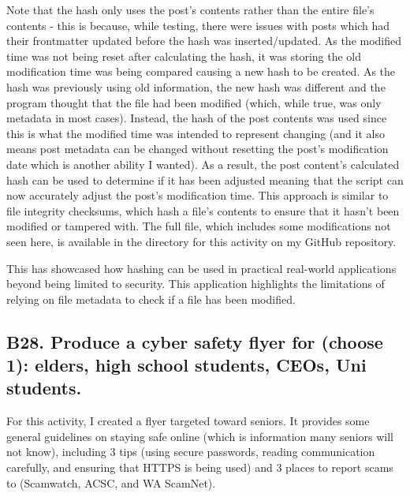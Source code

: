 \documentclass[titlepage]{article}
\begin{document}
        Note that the hash only uses the post's contents rather than the entire
        file's contents - this is because, while testing, there were issues with
        posts which had their frontmatter updated before the hash was
        inserted/updated. As the modified time was not being reset after
        calculating the hash, it was storing the old modification time was being
        compared causing a new hash to be created. As the hash was previously
        using old information, the new hash was different and the program
        thought that the file had been modified (which, while true, was only
        metadata in most cases). Instead, the hash of the post contents was used
        since this is what the modified time was intended to represent changing
        (and it also means post metadata can be changed without resetting the
        post's modification date which is another ability I wanted). As a
        result, the post content's calculated hash can be used to determine if
        it has been adjusted meaning that the script can now accurately adjust
        the post's modification time. This approach is similar to file integrity
        checksums, which hash a file's contents to ensure that it hasn't been
        modified or tampered with. The full file, which includes some
        modifications not seen here, is available in the directory for this
        activity on my GitHub repository.

        \vspace{0.5em}

        This has showcased how hashing can be used in practical real-world
        applications beyond being limited to security. This application
        highlights the limitations of relying on file metadata to check if a
        file has been modified.

    \newpage

    \subsection*{\centering B28. Produce a cyber safety flyer for (choose 1): elders, high school students, CEOs, Uni students.}
        For this activity, I created a flyer targeted toward seniors. It
        provides some general guidelines on staying safe online (which is
        information many seniors will not know), including 3 tips (using secure
        passwords, reading communication carefully, and ensuring that HTTPS is
        being used) and 3 places to report scams to (Scamwatch, ACSC, and WA
        ScamNet).
\end{document}

